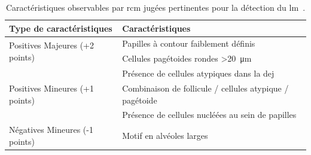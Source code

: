 \begin{table}[H]
\centering
    \begin{tabular}{ll}
        \toprule
        Type de caractéristiques                        & Caractéristiques                                              \\\hline
        \multirow{2}{*}{Positives Majeures (+2 points)} & Papilles à contour faiblement définis                         \\\cline{2-2}
                                                        & Cellules pagétoides rondes >\SI{20}{\micro\metre}             \\\hline
        \multirow{3}{*}{Positives Mineures (+1 points)} & Présence de cellules atypiques dans la \gls{dej}              \\\cline{2-2}
                                                        & Combinaison de follicule / cellules atypique / pagétoide      \\\cline{2-2}
                                                        & Présence de cellules nucléées au sein de papilles              \\\hline
        Négatives Mineures (-1 points)                  & Motif en alvéoles larges                                      \\
        \bottomrule
    \end{tabular}
\caption{Caractéristiques observables par \gls{rcm} jugées pertinentes pour la détection du \gls{lm}~\cite{Guitera2010}.}
\label{tab:rcm_algorithm_lentigo}
\end{table}\par
 
